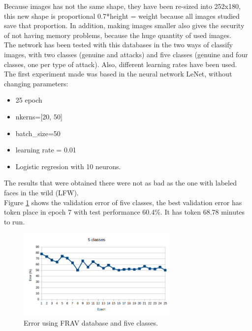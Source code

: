 Because images has not the same shape, they have been re-sized into 252x180, this new shape is proportional 0.7*height = weight because all images studied save that proportion. In addition, making images smaller also gives the security of not having memory problems, because the huge quantity of used images.\\

The network has been tested with this databases in the two ways of classify images, with two classes (genuine and attacks) and five classes (genuine and four classes, one per type of attack). Also, different learning rates have been used.\\


The first experiment made was based in the neural network LeNet, without changing parameters:\\

\begin{itemize}
\item 25 epoch
\item nkerns=[20, 50]
\item batch\_size=50
\item learning rate = 0.01
\item Logistic regresion with 10 neurons.\\
\end{itemize}

The results that were obtained there were not as bad as the one with labeled faces in the wild (LFW).\\

Figure \ref{fig:FRAV_five} shows the validation error of five classes, the best validation error has token place in epoch 7 with test performance 60.4\%. It has token 68.78 minutes to run.\\

\begin{figure}[htb]
\centering
\includegraphics[width=0.7\textwidth]{images/epoch_5classes_FRAV_1.png}
\caption{Error using FRAV database and five classes.}
\label{fig:FRAV_five}
\end{figure}

